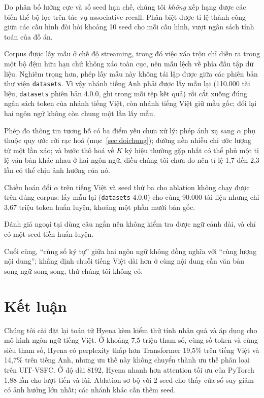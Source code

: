 \documentclass[11pt]{article}
\begin{document}
Do phân bố lưỡng cực và số seed hạn chế, chúng tôi \emph{không} xếp hạng được
các biến thể bộ lọc trên tác vụ associative recall. Phân biệt được tỉ lệ thành
công giữa các cấu hình đòi hỏi khoảng 10 seed cho mỗi cấu hình, vượt ngân sách
tính toán của đồ án.

Corpus được lấy mẫu ở chế độ streaming, trong đó việc xáo trộn chỉ diễn ra
trong một bộ đệm hữu hạn chứ không xáo toàn cục, nên mẫu lệch về phía đầu tập
dữ liệu. Nghiêm trọng hơn, phép lấy mẫu này không tái lập được giữa các phiên bản thư
viện \texttt{datasets}. Vì vậy nhánh tiếng Anh phải được lấy mẫu lại (110.000
tài liệu, \texttt{datasets} phiên bản 4.0.0, ghi trong mỗi tệp kết quả) rồi cắt
xuống đúng ngân sách token của nhánh tiếng Việt, còn nhánh tiếng Việt giữ mẫu
gốc; đổi lại hai ngôn ngữ không còn chung một lần lấy mẫu.

Phép đo thông tin tương hỗ có ba điểm yếu chưa xử lý: phép ánh xạ sang $\alpha$
phụ thuộc quy ước rời rạc hoá (mục~\ref{sec:doichung}); đường nền nhiễu chỉ ước
lượng từ một lần xáo; và bước thô hoá về $K$ ký hiệu thường gặp nhất có thể phủ
một tỉ lệ văn bản khác nhau ở hai ngôn ngữ, điều chúng tôi chưa đo nên tỉ lệ 1,7
đến 2,3 lần có thể chịu ảnh hưởng của nó.

Chiều hoán đổi $\alpha$ trên tiếng Việt và seed thứ ba cho ablation không chạy
được trên đúng corpus: lấy mẫu lại (\texttt{datasets} 4.0.0) cho cùng 90.000 tài
liệu nhưng chỉ 3,67 triệu token huấn luyện, khoảng một phần mười bản gốc.

Đánh giá ngoại tại dùng câu ngắn nên không kiểm tra được ngữ cảnh dài, và chỉ
có một seed tiền huấn luyện.

Cuối cùng, ``cùng số ký tự'' giữa hai ngôn ngữ không đồng nghĩa với ``cùng lượng
nội dung''; khẳng định chuỗi tiếng Việt dài hơn ở cùng nội dung cần văn bản song
ngữ song song, thứ chúng tôi không có.

\section{Kết luận}

Chúng tôi cài đặt lại toán tử Hyena kèm kiểm thử tính nhân quả và áp dụng cho
mô hình ngôn ngữ tiếng Việt. Ở khoảng 7,5 triệu tham số, cùng số token và cùng
siêu tham số, Hyena có perplexity thấp hơn Transformer 19,5\% trên tiếng Việt và
14,7\% trên tiếng Anh, nhưng ưu thế này không chuyển thành ưu thế phân loại trên
UIT-VSFC. Ở độ dài 8192, Hyena nhanh hơn attention tối ưu của PyTorch 1,88 lần
cho lượt tiến và lùi. Ablation sơ bộ với 2 seed cho thấy cửa sổ suy giảm có ảnh
hưởng lớn nhất; các nhánh khác cần thêm seed.
\end{document}
